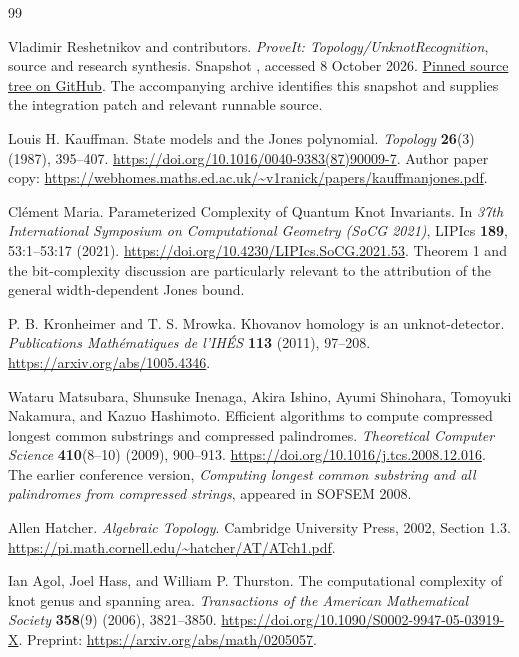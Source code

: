\documentclass[11pt]{article}
\theoremstyle{definition}
\theoremstyle{remark}
\newcommand{\code}[1]{\texttt{\detokenize{#1}}}
\begin{document}
\clearpage
\begin{thebibliography}{99}

Vladimir Reshetnikov and contributors.
\emph{ProveIt: Topology/UnknotRecognition}, source and research synthesis.
Snapshot \code{8a95834940cf77cdab1b39571ffc102ca8b6bede},
accessed 8 October 2026.
\href{https://github.com/VladimirReshetnikov/ProveIt/tree/8a95834940cf77cdab1b39571ffc102ca8b6bede/Topology/UnknotRecognition}{Pinned source tree on GitHub}.
The accompanying archive identifies this snapshot and supplies the
integration patch and relevant runnable source.

Louis H. Kauffman.
State models and the Jones polynomial.
\emph{Topology} \textbf{26}(3) (1987), 395--407.
\url{https://doi.org/10.1016/0040-9383(87)90009-7}.
Author paper copy:
\url{https://webhomes.maths.ed.ac.uk/~v1ranick/papers/kauffmanjones.pdf}.

Cl\'ement Maria.
Parameterized Complexity of Quantum Knot Invariants.
In \emph{37th International Symposium on Computational Geometry
(SoCG 2021)}, LIPIcs \textbf{189}, 53:1--53:17 (2021).
\url{https://doi.org/10.4230/LIPIcs.SoCG.2021.53}.
Theorem 1 and the bit-complexity discussion are particularly relevant
to the attribution of the general width-dependent Jones bound.

P. B. Kronheimer and T. S. Mrowka.
Khovanov homology is an unknot-detector.
\emph{Publications Math\'ematiques de l'IH\'ES} \textbf{113}
(2011), 97--208.
\url{https://arxiv.org/abs/1005.4346}.

Wataru Matsubara, Shunsuke Inenaga, Akira Ishino, Ayumi Shinohara,
Tomoyuki Nakamura, and Kazuo Hashimoto.
Efficient algorithms to compute compressed longest common substrings
and compressed palindromes.
\emph{Theoretical Computer Science} \textbf{410}(8--10)
(2009), 900--913.
\url{https://doi.org/10.1016/j.tcs.2008.12.016}.
The earlier conference version, \emph{Computing longest common substring
and all palindromes from compressed strings}, appeared in SOFSEM 2008.

Allen Hatcher.
\emph{Algebraic Topology}.
Cambridge University Press, 2002, Section 1.3.
\url{https://pi.math.cornell.edu/~hatcher/AT/ATch1.pdf}.

Ian Agol, Joel Hass, and William P. Thurston.
The computational complexity of knot genus and spanning area.
\emph{Transactions of the American Mathematical Society}
\textbf{358}(9) (2006), 3821--3850.
\url{https://doi.org/10.1090/S0002-9947-05-03919-X}.
Preprint: \url{https://arxiv.org/abs/math/0205057}.


\end{thebibliography}
\end{document}
